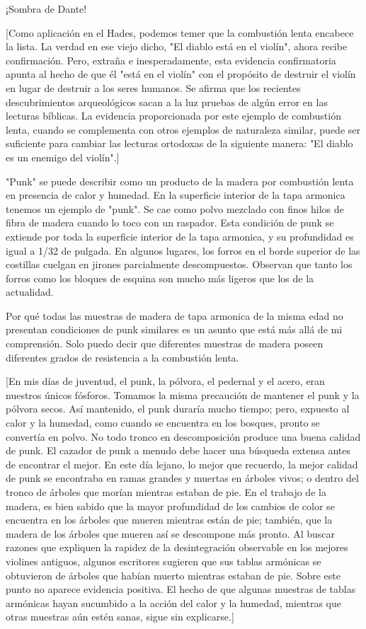 \documentclass[12pt]{book}
\begin{document}
¡Sombra de Dante!

[Como aplicación en el Hades, podemos temer que la combustión lenta encabece la lista. La verdad en ese viejo dicho, "El diablo está en el violín", ahora recibe confirmación. Pero, extraña e inesperadamente, esta evidencia confirmatoria apunta al hecho de que él "está en el violín" con el propósito de destruir el violín en lugar de destruir a los seres humanos. Se afirma que los recientes descubrimientos arqueológicos sacan a la luz pruebas de algún error en las lecturas bíblicas. La evidencia proporcionada por este ejemplo de combustión lenta, cuando se complementa con otros ejemplos de naturaleza similar, puede ser suficiente para cambiar las lecturas ortodoxas de la siguiente manera: "El diablo es un enemigo del violín".]

"Punk" se puede describir como un producto de la madera por combustión lenta en presencia de calor y humedad. En la superficie interior de la tapa armonica tenemos un ejemplo de "punk". Se cae como polvo mezclado con finos hilos de fibra de madera cuando lo toco con un raspador. Esta condición de punk se extiende por toda la superficie interior de la tapa armonica, y su profundidad es igual a 1/32 de pulgada. En algunos lugares, los forros en el borde superior de las costillas cuelgan en jirones parcialmente descompuestos. Observan que tanto los forros como los bloques de esquina son mucho más ligeros que los de la actualidad.

Por qué todas las muestras de madera de tapa armonica de la misma edad no presentan condiciones de punk similares es un asunto que está más allá de mi comprensión. Solo puedo decir que diferentes muestras de madera poseen diferentes grados de resistencia a la combustión lenta.

[En mis días de juventud, el punk, la pólvora, el pedernal y el acero, eran nuestros únicos fósforos. Tomamos la misma precaución de mantener el punk y la pólvora secos. Así mantenido, el punk duraría mucho tiempo; pero, expuesto al calor y la humedad, como cuando se encuentra en los bosques, pronto se convertía en polvo. No todo tronco en descomposición produce una buena calidad de punk. El cazador de punk a menudo debe hacer una búsqueda extensa antes de encontrar el mejor. En este día lejano, lo mejor que recuerdo, la mejor calidad de punk se encontraba en ramas grandes y muertas en árboles vivos; o dentro del tronco de árboles que morían mientras estaban de pie. En el trabajo de la madera, es bien sabido que la mayor profundidad de los cambios de color se encuentra en los árboles que mueren mientras están de pie; también, que la madera de los árboles que mueren así se descompone más pronto. Al buscar razones que expliquen la rapidez de la desintegración observable en los mejores violines antiguos, algunos escritores sugieren que sus tablas armónicas se obtuvieron de árboles que habían muerto mientras estaban de pie. Sobre este punto no aparece evidencia positiva.
El hecho de que algunas muestras de tablas armónicas hayan sucumbido a la acción del calor y la humedad, mientras que otras muestras aún estén sanas, sigue sin explicarse.]
\end{document}
